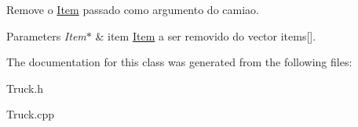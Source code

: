 Remove o \hyperlink{class_item}{Item} passado como argumento do camiao. 


\begin{DoxyParams}{Parameters}
{\em Item$\ast$} & item \hyperlink{class_item}{Item} a ser removido do vector items\mbox{[}\mbox{]}. \\
\hline
\end{DoxyParams}


The documentation for this class was generated from the following files\+:\begin{DoxyCompactItemize}
\item 
Truck.\+h\item 
Truck.\+cpp\end{DoxyCompactItemize}
